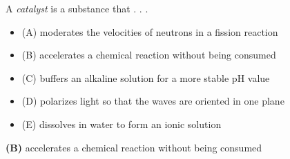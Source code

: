 

A {\it catalyst} is a substance that . . .

\begin{itemize}
\item{(A)} moderates the velocities of neutrons in a fission reaction
\vskip 5pt 
\item{(B)} accelerates a chemical reaction without being consumed
\vskip 5pt 
\item{(C)} buffers an alkaline solution for a more stable pH value
\vskip 5pt 
\item{(D)} polarizes light so that the waves are oriented in one plane
\vskip 5pt 
\item{(E)} dissolves in water to form an ionic solution
\end{itemize}







{\bf (B)} accelerates a chemical reaction without being consumed
 










